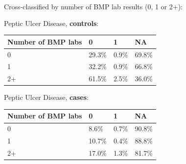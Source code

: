 \documentclass[12pt]{article}
\begin{document}
Cross-classified by number of BMP lab results (0, 1 or 2+):

Peptic Ulcer Disease, {\bf controls}:
\begin{center}
\begin{tabular}{|l|l|l|l|}
  \hline
Number of BMP labs & 0 & 1 & NA \\ \hline
0                   & 29.3\% & 0.9\% & 69.8\% \\ \hline
1                     & 32.2\% & 0.9\% & 66.8\% \\ \hline
2+                    & 61.5\% & 2.5\% & 36.0\% \\ \hline
\end{tabular}
\end{center}

Peptic Ulcer Disease, {\bf cases}:
\begin{center}
\begin{tabular}{|l|l|l|l|}
  \hline
Number of BMP labs & 0 & 1 & NA \\ \hline
0                   & 8.6\% & 0.7\% & 90.8\% \\ \hline
1                     & 10.7\% & 0.4\% & 88.8\% \\ \hline
2+                    & 17.0\% & 1.3\% & 81.7\% \\ \hline
\end{tabular}
\end{center}

%
\end{document}
